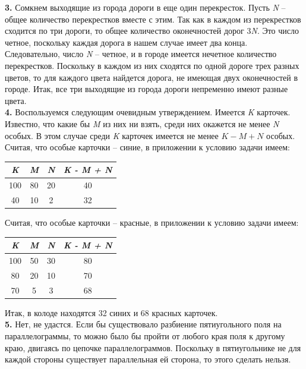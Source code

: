 \begin{multicols}{2}
    \textbf{3.} Сомкнем выходящие из города дороги в еще один перекресток. Пусть \emph{N} – общее количество перекрестков вместе с этим. Так как в каждом из перекрестков сходится по три дороги, то общее количество оконечностей дорог 3\emph{N}. Это число четное, поскольку каждая дорога в нашем случае имеет два конца. Следовательно, число \emph{N} – четное, и в городе имеется нечетное количество перекрестков. Поскольку в каждом из них сходятся по одной дороге трех разных цветов, то для каждого цвета найдется дорога, не имеющая двух оконечностей в городе. Итак, все три выходящие из города дороги непременно имеют разные цвета.\\ 
    \textbf{4.} Воспользуемся следующим очевидным утверждением. Имеется \emph{K} карточек. Известно, что какие бы \emph{M} из них ни взять, среди них окажется не менее \emph{N} особых. В этом случае среди \emph{K} карточек имеется не менее $K - M + N$ особых. Считая, что особые карточки – синие, в приложении к условию задачи имеем:\\
    \begin{center}
        \begin{tabular}{|c|c|c|c|}
            \hline
            \emph{K} & \emph{M} & \emph{N} & \emph{K - M + N} \\ \hline
            100 & 80 & 20 & 40 \\ \hline
            40 & 10 & 2 & 32 \\ 
            \hline
        \end{tabular}
    \end{center}
    Считая, что особые карточки – красные, в приложении к условию задачи имеем: \\
    \begin{center}
        \begin{tabular}{|c|c|c|c|}
            \hline
            \emph{K} & \emph{M} & \emph{N} & \emph{K - M + N} \\ 
            \hline
            100 & 50 & 30 & 80 \\ \hline
            80 & 20 & 10 & 70 \\ \hline
            70 & 5 & 3 & 68 \\ 
            \hline
        \end{tabular}
    \end{center}
    Итак, в колоде находятся 32 синих и 68 красных карточек.\\ 
    \textbf{5.} Нет, не удастся. Если бы существовало разбиение пятиугольного поля на параллелограммы, то можно было бы пройти от любого края поля к другому краю, двигаясь по цепочке параллелограммов. Поскольку в пятиугольнике не для каждой стороны существует параллельная ей сторона, то этого сделать нельзя.

\end{multicols}
